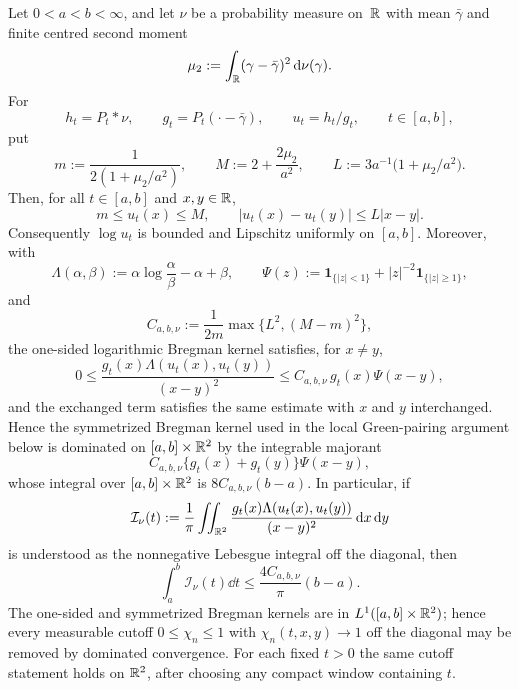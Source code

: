 \begin{lemma}%
\label{lem:matched-poisson-quotient-cauchy-bregman-domain}
\label{thm:matched-poisson-quotient-cauchy-bregman-domain}
\label{lem:single-compact-window-bregman-majorant-constants}
\label{lem:bregman-kernel-l1-cutoff-removal}
Let \(0<a<b<\infty\), and let \(\nu\) be a probability measure on~\(\mathbb{R}\)
with mean \(\bar{\gamma}\) and finite centred second moment
\[
\mu_2:=\int_{\mathbb{R}}(\gamma-\bar{\gamma})^2\,\mathrm{d}\nu(\gamma).
\]
For
\[
h_t=P_t*\nu,\qquad g_t=P_t(\cdot-\bar{\gamma}),\qquad u_t=h_t/g_t,
\qquad t\in[a,b],
\]
put
\[
m:=\frac{1}{2(1+\mu_2/a^2)},\qquad
M:=2+\frac{2\mu_2}{a^2},\qquad
L:=3a^{-1}\bigl(1+\mu_2/a^2\bigr).
\]
Then, for all \(t\in[a,b]\) and \(x,y\in\mathbb{R}\),
\begin{equation}\label{eq:matched-poisson-quotient-domain-mML}
m\le u_t(x)\le M,\qquad
|u_t(x)-u_t(y)|\le L|x-y|.
\end{equation}
Consequently \(\log u_t\) is bounded and Lipschitz uniformly on
\([a,b]\).  Moreover, with
\[
\Lambda(\alpha,\beta):=\alpha\log\frac{\alpha}{\beta}-\alpha+\beta,
\qquad
\Psi(z):=\mathbf1_{\{|z|<1\}}+|z|^{-2}\mathbf1_{\{|z|\ge1\}},
\]
and
\[
C_{a,b,\nu}:=\frac{1}{2m}\max\{L^2,(M-m)^2\},
\]
the one-sided logarithmic Bregman kernel satisfies, for \(x\ne y\),
\begin{equation}\label{eq:matched-poisson-one-sided-bregman-majorant}
0\le
\frac{g_t(x)\Lambda(u_t(x),u_t(y))}{(x-y)^2}
\le C_{a,b,\nu}\,g_t(x)\Psi(x-y),
\end{equation}
and the exchanged term satisfies the same estimate with \(x\) and \(y\)
interchanged.  Hence the symmetrized Bregman kernel used in the local
Green-pairing argument below is dominated on
\([a,b]\times\mathbb{R}^2\) by the integrable majorant
\begin{equation}\label{eq:matched-poisson-sym-bregman-integrable-majorant}
C_{a,b,\nu}\{g_t(x)+g_t(y)\}\Psi(x-y),
\end{equation}
whose integral over \([a,b]\times\mathbb{R}^2\) is \(8C_{a,b,\nu}(b-a)\).  In
particular, if
\[
\mathcal I_\nu(t):=\frac1\pi\iint_{\mathbb{R}^2}
\frac{g_t(x)\Lambda(u_t(x),u_t(y))}{(x-y)^2}\,\mathrm{d} x\,\mathrm{d} y
\]
is understood as the nonnegative Lebesgue integral off the diagonal, then
\begin{equation}\label{eq:single-lemma-one-sided-majorant-integral}
\int_a^b\mathcal I_\nu(t)\dd t
\le \frac{4C_{a,b,\nu}}{\pi}(b-a).
\end{equation}
The one-sided and symmetrized Bregman kernels are in
\(L^1([a,b]\times\mathbb{R}^2)\); hence every measurable cutoff
\(0\le\chi_n\le1\) with \(\chi_n(t,x,y)\to1\) off the diagonal may be removed
by dominated convergence.  For each fixed \(t>0\) the same cutoff statement
holds on \(\mathbb{R}^2\), after choosing any compact window containing \(t\).
\end{lemma}

